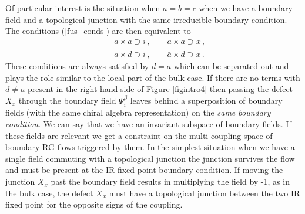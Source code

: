 \documentclass[a4paper,11pt]{article}
\theoremstyle{plain}
\theoremstyle{definition}
\def\bea{\begin{eqnarray}}
\def\eea{\end{eqnarray}}
\begin{document}
Of particular interest is the situation when $a=b=c$ when we have a boundary field and a topological junction with the same irreducible boundary 
condition. The conditions (\ref{fus_conds}) are then equivalent to 
\bea \label{fus_conds2}
&& a \times \bar a \supset i  \, , \qquad a\times \bar a \supset x  \, , \nonumber \\
&& a\times \bar d \supset i \, , \qquad \bar{a} \times  d \supset x \, . 
\eea  
These conditions are always satisfied by $d=a$ which can be separated out and plays the role similar to the local part of the bulk case. 
If there are no terms with $d\ne a$ present in the right hand side of Figure \ref{figintro4} then passing the defect $X_{x}$ through the boundary 
field $\Psi_i^\beta$ leaves behind a superposition of boundary fields (with the same chiral algebra representation)   on the {\it same boundary 
condition}. We can say that we have an invariant subspace of boundary fields. If these fields  are relevant we get a constraint on the 
multi coupling space of boundary RG flows triggered by them. In the simplest situation when we have a single field commuting with a topological junction 
the junction survives the flow and must be present at the IR fixed point boundary condition. If moving the junction $X_{x}$ past the boundary field results in 
multiplying the field by -1, as in the bulk case, the defect $X_{x}$ must have a topological junction between the two IR fixed point for the opposite signs of the coupling.
\end{document}
